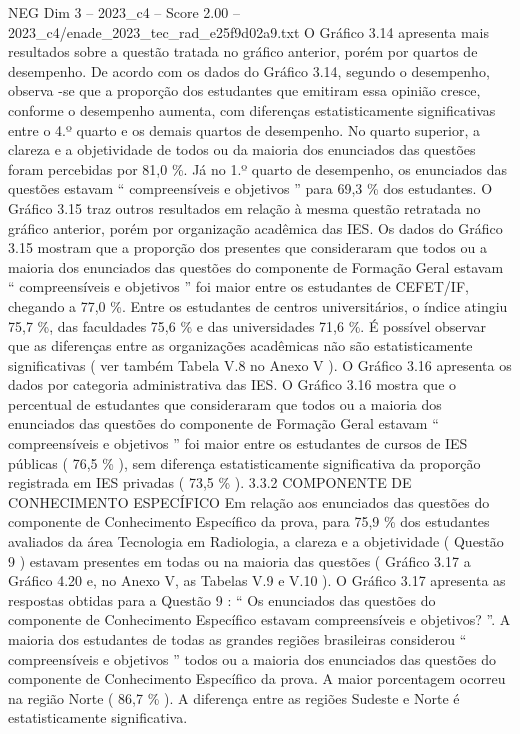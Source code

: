 \begin{textsample}{NEG Dim 3 – 2023\_c4 – Score 2.00 – 2023\_c4/enade\_2023\_tec\_rad\_e25f9d02a9.txt}
O Gráfico 3.14 apresenta mais resultados sobre a questão tratada no gráfico anterior, porém por quartos de desempenho.
De acordo com os dados do Gráfico 3.14, segundo o desempenho, observa -se que a proporção dos estudantes que emitiram essa opinião cresce, conforme o desempenho aumenta, com diferenças estatisticamente significativas entre o 4.º quarto e os demais quartos de desempenho.
No quarto superior, a clareza e a objetividade de todos ou da maioria dos enunciados das questões foram percebidas por 81,0 \%.
Já no 1.º quarto de desempenho, os enunciados das questões estavam “ compreensíveis e objetivos ” para 69,3 \% dos estudantes.
O Gráfico 3.15 traz outros resultados em relação à mesma questão retratada no gráfico anterior, porém por organização acadêmica das IES.
Os dados do Gráfico 3.15 mostram que a proporção dos presentes que consideraram que todos ou a maioria dos enunciados das questões do componente de Formação Geral estavam “ compreensíveis e objetivos ” foi maior entre os estudantes de CEFET/IF, chegando a 77,0 \%.
Entre os estudantes de centros universitários, o índice atingiu 75,7 \%, das faculdades 75,6 \% e das universidades 71,6 \%.
É possível observar que as diferenças entre as organizações acadêmicas não são estatisticamente significativas ( ver também Tabela V.8 no Anexo V ).
O Gráfico 3.16 apresenta os dados por categoria administrativa das IES.
O Gráfico 3.16 mostra que o percentual de estudantes que consideraram que todos ou a maioria dos enunciados das questões do componente de Formação Geral estavam “ compreensíveis e objetivos ” foi maior entre os estudantes de cursos de IES públicas ( 76,5 \% ), sem diferença estatisticamente significativa da proporção registrada em IES privadas ( 73,5 \% ). 3.3.2 COMPONENTE DE CONHECIMENTO ESPECÍFICO Em relação aos enunciados das questões do componente de Conhecimento Específico da prova, para 75,9 \% dos estudantes avaliados da área Tecnologia em Radiologia, a clareza e a objetividade ( Questão 9 ) estavam presentes em todas ou na maioria das questões ( Gráfico 3.17 a Gráfico 4.20 e, no Anexo V, as Tabelas V.9 e V.10 ).
O Gráfico 3.17 apresenta as respostas obtidas para a Questão 9 : “ Os enunciados das questões do componente de Conhecimento Específico estavam compreensíveis e objetivos? ”.
A maioria dos estudantes de todas as grandes regiões brasileiras considerou “ compreensíveis e objetivos ” todos ou a maioria dos enunciados das questões do componente de Conhecimento Específico da prova.
A maior porcentagem ocorreu na região Norte ( 86,7 \% ).
A diferença entre as regiões Sudeste e Norte é estatisticamente significativa.

\end{textsample}
